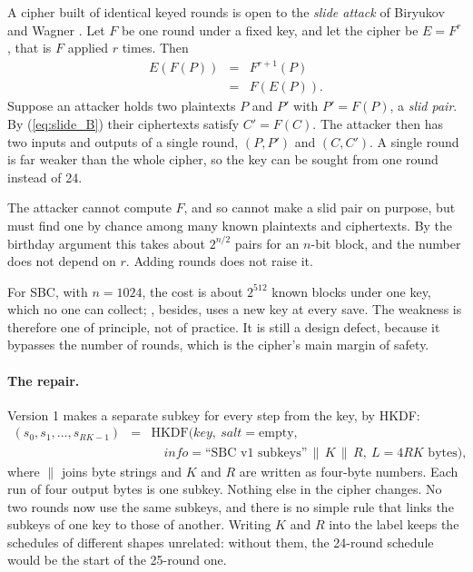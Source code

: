 A cipher built of identical keyed rounds is open to the \emph{slide attack} of
Biryukov and Wagner \cite{biryukov1999,biryukov2000}. Let $F$ be one round
under a fixed key, and let the cipher be $E = F^{r}$, that is $F$ applied $r$
times. Then
\begin{eqnarray}
E(F(P)) &=& F^{r+1}(P) \label{eq:slide_A} \\
        &=& F(E(P)). \label{eq:slide_B}
\end{eqnarray}
Suppose an attacker holds two plaintexts $P$ and $P'$ with $P' = F(P)$, a
\emph{slid pair}. By (\ref{eq:slide_B}) their ciphertexts satisfy
$C' = F(C)$. The attacker then has two inputs and outputs of a single round,
$(P, P')$ and $(C, C')$. A single round is far weaker than the whole cipher, so
the key can be sought from one round instead of 24.

The attacker cannot compute $F$, and so cannot make a slid pair on purpose, but
must find one by chance among many known plaintexts and ciphertexts. By the
birthday argument this takes about $2^{n/2}$ pairs for an $n$-bit block, and the
number does not depend on $r$. Adding rounds does not raise it.

For SBC, with $n = 1024$, the cost is about $2^{512}$ known blocks under one
key, which no one can collect; , besides, uses a new key at every
save. The weakness is therefore one of principle, not of practice. It is still
a design defect, because it bypasses the number of rounds, which is the
cipher's main margin of safety.

\paragraph{The repair.}
Version 1 makes a separate subkey for every step from the key, by HKDF:
\begin{eqnarray}
(s_0, s_1, \ldots, s_{RK-1}) &=& \mathrm{HKDF}\bigl(\mathit{key},\
  \mathit{salt} = \text{empty}, \label{eq:v1_A} \\
 & & \quad \mathit{info} = \text{``SBC v1 subkeys''} \,\|\, K \,\|\, R,\
  L = 4RK \text{ bytes}\bigr), \nonumber
\end{eqnarray}
where $\|$ joins byte strings and $K$ and $R$ are written as four-byte numbers.
Each run of four output bytes is one subkey. Nothing else in the cipher
changes. No two rounds now use the same subkeys, and there is no simple rule
that links the subkeys of one key to those of another. Writing $K$ and $R$ into
the label keeps the schedules of different shapes unrelated: without them, the
24-round schedule would be the start of the 25-round one.

